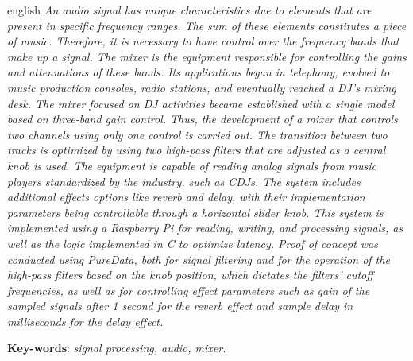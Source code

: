 \begin{resumo}[Abstract]
 \begin{otherlanguage*}{english}
  \textit{
    An audio signal has unique characteristics due to elements that are present in specific frequency ranges. The sum of these elements constitutes a piece of music. Therefore, it is necessary to have control over the frequency bands that make up a signal. The mixer is the equipment responsible for controlling the gains and attenuations of these bands. Its applications began in telephony, evolved to music production consoles, radio stations, and eventually reached a DJ’s mixing desk. The mixer focused on DJ activities became established with a single model based on three-band gain control. Thus, the development of a mixer that controls two channels using only one control is carried out. The transition between two tracks is optimized by using two high-pass filters that are adjusted as a central knob is used. The equipment is capable of reading analog signals from music players standardized by the industry, such as CDJs. The system includes additional effects options like reverb and delay, with their implementation parameters being controllable through a horizontal slider knob. This system is implemented using a Raspberry Pi for reading, writing, and processing signals, as well as the logic implemented in C to optimize latency. Proof of concept was conducted using PureData, both for signal filtering and for the operation of the high-pass filters based on the knob position, which dictates the filters' cutoff frequencies, as well as for controlling effect parameters such as gain of the sampled signals after 1 second for the reverb effect and sample delay in milliseconds for the delay effect.
    }
    
   \textbf{Key-words}: \textit{signal processing, audio, mixer.}
 \end{otherlanguage*}
\end{resumo}

